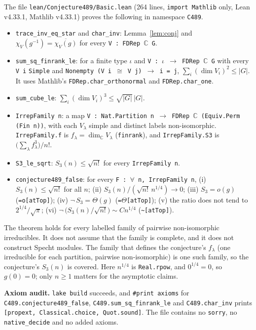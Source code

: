 \documentclass[11pt]{article}
\theoremstyle{definition}
\begin{document}
The file \texttt{lean/Conjecture489/Basic.lean} (264 lines, \texttt{import Mathlib} only, Lean
v4.33.1, Mathlib v4.33.1) proves the following in namespace \texttt{C489}.
\begin{itemize}
\item \texttt{trace\_inv\_eq\_star} and \texttt{char\_inv}: Lemma~\ref{lem:conj} and
  $\chi_V(g^{-1})=\overline{\chi_V(g)}$ for every \texttt{V : FDRep $\mathbb C$ G}.
\item \texttt{sum\_sq\_finrank\_le}: for a finite type $\iota$ and
  \texttt{V : $\iota$ $\to$ FDRep $\mathbb C$ G} with every \texttt{V i} \texttt{Simple} and
  \texttt{Nonempty (V i $\cong$ V j) $\to$ i = j}, $\sum_i(\dim V_i)^2\le|G|$. It uses Mathlib's
  \texttt{FDRep.char\_orthonormal} and \texttt{FDRep.char\_one}.
\item \texttt{sum\_cube\_le}: $\sum_i(\dim V_i)^3\le\sqrt{|G|}\,|G|$.
\item \texttt{IrrepFamily n}: a map \texttt{V : Nat.Partition n $\to$ FDRep $\mathbb C$
  (Equiv.Perm (Fin n))}, with each $V_\lambda$ simple and distinct labels non-isomorphic.
  \texttt{IrrepFamily.f} is $f_\lambda=\dim_{\mathbb C}V_\lambda$ (\texttt{finrank}), and
  \texttt{IrrepFamily.S3} is $\bigl(\sum_\lambda f_\lambda^3\bigr)/n!$.
\item \texttt{S3\_le\_sqrt}: $S_3(n)\le\sqrt{n!}$ for every \texttt{IrrepFamily n}.
\item \texttt{conjecture489\_false}: for every \texttt{F : $\forall$ n, IrrepFamily n},
  (i) $S_3(n)\le\sqrt{n!}$ for all $n$; (ii) $S_3(n)/(\sqrt{n!}\,n^{1/4})\to0$;
  (iii) $S_3=o(g)$ (\texttt{=o[atTop]});
  (iv) $\neg\,S_3=\Theta(g)$ (\texttt{=$\Theta$[atTop]}); (v) the ratio does not tend to
  $2^{1/4}/\sqrt\pi$; (vi) $\neg\,\bigl(S_3(n)/\sqrt{n!}\bigr)\sim C n^{1/4}$
  (\texttt{\textasciitilde[atTop]}).
\end{itemize}
The theorem holds for every labelled family of pairwise non-isomorphic irreducibles. It does not
assume that the family is complete, and it does not construct Specht modules. The family that
defines the conjecture's $f_\lambda$ (one irreducible for each partition, pairwise
non-isomorphic) is one such family, so the conjecture's $S_3(n)$ is covered. Here
$n^{1/4}$ is \texttt{Real.rpow}, and $0^{1/4}=0$, so $g(0)=0$; only $n\ge1$ matters for the
asymptotic claims.

\textbf{Axiom audit.} \texttt{lake build} succeeds, and \texttt{\#print axioms} for
\texttt{C489.conjecture489\_false}, \texttt{C489.sum\_sq\_finrank\_le} and
\texttt{C489.char\_inv} prints \texttt{[propext, Classical.choice, Quot.sound]}. The file contains no
\texttt{sorry}, no \texttt{native\_decide} and no added axioms.
\end{document}
